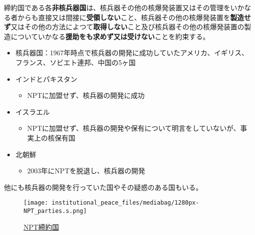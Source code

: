 \documentclass[
  xelatex,
  ja=standard]{bxjsarticle}
\providecommand{\tightlist}{%
  \setlength{\itemsep}{0pt}\setlength{\parskip}{0pt}}\usepackage{longtable,booktabs,array}
\begin{document}
\begin{tcolorbox}[enhanced jigsaw, left=2mm, toprule=.15mm, opacityback=0, colframe=quarto-callout-note-color-frame, opacitybacktitle=0.6, breakable, coltitle=black, colbacktitle=quarto-callout-note-color!10!white, colback=white, bottomtitle=1mm, toptitle=1mm, titlerule=0mm, title=\textcolor{quarto-callout-note-color}{\faInfo}\hspace{0.5em}{\href{https://www1.doshisha.ac.jp/~karai/intlaw/docs/npt.htm}{核兵器不拡散条約}　第2条}, arc=.35mm, rightrule=.15mm, bottomrule=.15mm, leftrule=.75mm]

締約国である各\textbf{非核兵器国}は、核兵器その他の核爆発装置又はその管理をいかなる者からも直接又は間接に\textbf{受領しない}こと、核兵器その他の核爆発装置を\textbf{製造せず}又はその他の方法によつて\textbf{取得しない}こと及び核兵器その他の核爆発装置の製造についていかなる\textbf{援助をも求めず又は受けない}ことを約束する。

\end{tcolorbox}

\begin{itemize}
\tightlist
\item
  核兵器国：1967年時点で核兵器の開発に成功していたアメリカ、イギリス、フランス、ソビエト連邦、中国の5ヶ国
\item
  インドとパキスタン

  \begin{itemize}
  \tightlist
  \item
    NPTに加盟せず、核兵器の開発に成功
  \end{itemize}
\item
  イスラエル

  \begin{itemize}
  \tightlist
  \item
    NPTに加盟せず、核兵器の開発や保有について明言をしていないが、事実上の核保有国
  \end{itemize}
\item
  北朝鮮

  \begin{itemize}
  \tightlist
  \item
    2003年にNPTを脱退し、核兵器の開発
  \end{itemize}
\end{itemize}

他にも核兵器の開発を行っていた国やその疑惑のある国もいる。

\begin{figure}[htpb]

{\centering \texttt{[image: institutional\_peace\_files/mediabag/1280px-NPT\_parties.s.png]}

}

\caption{\href{https://commons.wikimedia.org/wiki/File:NPT_parties.svg}{NPT締約国}}

\end{figure}
\end{document}
